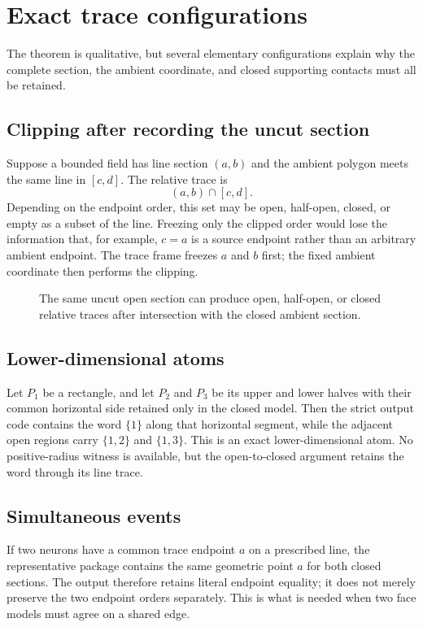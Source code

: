 \section{Exact trace configurations}\label{sec:examples}

The theorem is qualitative, but several elementary configurations explain
why the complete section, the ambient coordinate, and closed supporting
contacts must all be retained.

\subsection{Clipping after recording the uncut section}

Suppose a bounded field has line section $(a,b)$ and the ambient polygon
meets the same line in $[c,d]$.  The relative trace is
\[
 (a,b)\cap[c,d].
\]
Depending on the endpoint order, this set may be open, half-open, closed,
or empty as a subset of the line.  Freezing only the clipped order would
lose the information that, for example, $c=a$ is a source endpoint rather
than an arbitrary ambient endpoint.  The trace frame freezes $a$ and $b$
first; the fixed ambient coordinate then performs the clipping.

\begin{figure}[t]
\centering

\caption{The same uncut open section can produce open, half-open, or closed
relative traces after intersection with the closed ambient section.}
\label{fig:clipping}
\end{figure}

\subsection{Lower-dimensional atoms}

Let $P_1$ be a rectangle, and let $P_2$ and $P_3$ be its upper and lower
halves with their common horizontal side retained only in the closed model.
Then the strict output code contains the word $\{1\}$ along that horizontal
segment, while the adjacent open regions carry $\{1,2\}$ and $\{1,3\}$.
This is an exact lower-dimensional atom.  No positive-radius witness is
available, but the open-to-closed argument retains the word through its line
trace.

\subsection{Simultaneous events}

If two neurons have a common trace endpoint $a$ on a prescribed line, the
representative package contains the same geometric point $a$ for both
closed sections.  The output therefore retains literal endpoint equality;
it does not merely preserve the two endpoint orders separately.  This is
what is needed when two face models must agree on a shared edge.

